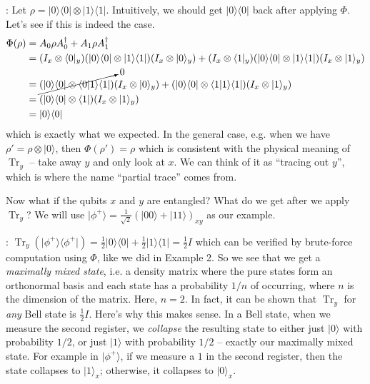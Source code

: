 \documentclass[11pt]{article}
\newcommand{\op}[2]{#1#2#1^\dag}
\newcommand{\tr}{\operatorname{Tr}}
\newcommand{\bra}[1]{\langle #1 \rvert}
\newcommand{\ket}[1]{\lvert #1 \rangle}
\newcommand{\bret}[2]{\langle{#1}|{#2}\rangle}
\newcommand{\kret}[2]{\ket{#1}\bra{#2}}
\newcommand{\kera}[1]{\kret{#1}{#1}}
\newcommand{\Example}[1]{{\bf Example #1}:}
\def\fill{   \hfill}
\begin{document}
\fill

\noindent \Example{2} Let $\rho = \kera{0} \otimes \kera{1}$. Intuitively, we should get $\kera{0}$ back after applying $\Phi$. Let's see if this is indeed the case.
\begin{align*}
\Phi(\rho)
&= \op{A_0}{\rho} + \op{A_1}{\rho} \\
&= (I_x \otimes \bra{0}_y)(\kera{0} \otimes \kera{1})(I_x \otimes \ket{0}_y)
+  (I_x \otimes \bra{1}_y)(\kera{0} \otimes \kera{1})(I_x \otimes \ket{1}_y) \\
&= \cancelto{0}{(\kera{0} \otimes \bret{0}{1}\bra{1})}(I_x \otimes \ket{0}_y)
+  (\kera{0} \otimes \bret{1}{1}\bra{1})(I_x \otimes \ket{1}_y) \\
&= (\kera{0} \otimes \bra{1})(I_x \otimes \ket{1}_y) \\
&= \kera{0}
\end{align*}
which is exactly what we expected. In the general case, e.g. when we have $\rho' = \rho \otimes \ket{0}$, then $\Phi(\rho') = \rho$ which is consistent with the physical meaning of $\tr_y$ -- take away $y$ and only look at $x$. We can think of it as ``tracing out $y$'', which is where the name ``partial trace'' comes from.

\fill

\noindent Now what if the qubits $x$ and $y$ are entangled? What do we get after we apply $\tr_y$? We will use $\ket{\phi^+} = \frac{1}{\sqrt{2}}(\ket{00} + \ket{11})_{xy}$ as our example.

\fill

\noindent \Example{3} $\tr_y(\kera{\phi^+}) = \frac{1}{2}\kera{0} + \frac{1}{2}\kera{1} = \frac{1}{2}I$ which can be verified by brute-force computation using $\Phi$, like we did in Example 2. So we see that we get a \emph{maximally mixed state}, i.e. a density matrix where the pure states form an orthonormal basis and each state has a probability $1/n$ of occurring, where $n$ is the dimension of the matrix. Here, $n = 2$. In fact, it can be shown that $\tr_y$ for \emph{any} Bell state is $\frac{1}{2}I$. Here's why this makes sense. In a Bell state, when we measure the second register, we \emph{collapse} the resulting state to either just $\ket{0}$ with probability $1/2$, or just $\ket{1}$ with probability $1/2$ -- exactly our maximally mixed state. For example in $\ket{\phi^+}$, if we measure a $1$ in the second register, then the state collapses to $\ket{1}_x$; otherwise, it collapses to $\ket{0}_x$.

\fill
\end{document}
